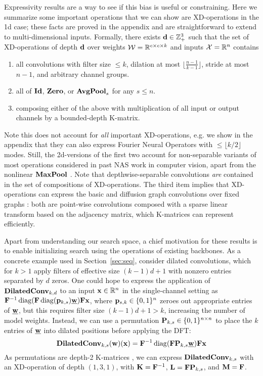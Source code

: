 Expressivity results are a way to see if this bias is useful or constraining.
Here we summarize some important operations that we can show are XD-operations in the 1d case; 
these facts are proved in the appendix and are straightforward to extend to multi-dimensional inputs.
Formally, there exists $\mathbf{d}\in\mathbb Z_+^3$ such that the set of XD-operations of depth $\mathbf{d}$ over weights $\mathcal W=\mathbb R^{c\times c\times k}$ and inputs $\mathcal X=\mathbb R^n$ contains
\begin{enumerate}[leftmargin=*,topsep=-1pt,noitemsep]\setlength\itemsep{2pt}
	\item all convolutions with filter size $\le k$, dilation at most $\lfloor\frac{n-1}{k-1}\rfloor$, stride at most $n-1$, and arbitrary channel groups.
	\item all of $\operatorname{\operatorname{\bf Id}}$, $\operatorname{\operatorname{\bf Zero}}$, or $\operatorname{\operatorname{\bf AvgPool}}_s$ for any $s\le n$.
	\item composing either of the above with multiplication of all input or output channels by a bounded-depth K-matrix.
\end{enumerate}
Note this does not account for {\em all} important XD-operations, e.g. we show in the appendix that they can also express Fourier Neural Operators \citep{li2021fno} with $\le\lfloor k/2\rfloor$ modes.
Still, the 2d-versions of the first two account for non-separable variants of most operations considered in past NAS work in computer vision, apart from the nonlinear $\operatorname{\operatorname{\bf MaxPool}}$ \citep{ying2019nasbench101,dong2020nasbench201}.
Note that depthwise-separable convolutions {\em are} contained in the set of compositions of XD-operations.
The third item implies that XD-operations can express the basic and diffusion graph convolutions over fixed graphs \citep{kipf2017gcn,li2018dcrnn}:
both are point-wise convolutions composed with a sparse linear transform based on the adjacency matrix, which  K-matrices can represent efficiently.

Apart from understanding our search space, a chief motivation for these results is to enable initializing search using the operations of existing backbones.
As a concrete example used in Section~\ref{sec:seq}, consider dilated convolutions, which for $k>1$ apply filters of effective size $(k-1)d+1$ with nonzero entries separated by $d$ zeros.
One could hope to express the application of $\operatorname{\operatorname{\bf DilatedConv}}_{k,d}$ to an input $\mathbf{x}\in\mathbb R^n$ in the single-channel setting as $\mathbf{F}^{-1}\operatorname{\operatorname{diag}}(\mathbf{F}\operatorname{\operatorname{diag}}(\mathbf{p}_{k,s})\underline{\mathbf{w}})\mathbf{F}\mathbf{x}$, where $\mathbf{p}_{s,k}\in\{0,1\}^n$ zeroes out appropriate entries of $\underline{\mathbf{w}}$, but this requires filter size $(k-1)d+1>k$, increasing the number of model weights.
Instead, we can use a permutation $\mathbf{P}_{k,s}\in\{0,1\}^{n\times n}$ to place the $k$ entries of $\underline{\mathbf{w}}$ into dilated positions before applying the DFT:
\begin{equation}\label{eq:dilated}
	\operatorname{\operatorname{\bf DilatedConv}}_{k,s}(\mathbf{w})(\mathbf{x})=\mathbf{F}^{-1}\operatorname{\operatorname{diag}}(\mathbf{F}\mathbf{P}_{k,s}\underline{\mathbf{w}})\mathbf{F}\mathbf{x}
\end{equation}
As permutations are depth-2 K-matrices \citep{dao2020kaleidoscope}, we can express $\operatorname{\operatorname{\bf DilatedConv}}_{k,s}$ with an XD-operation of depth $(1,3,1)$, with $\mathbf{K}=\mathbf{F}^{-1}$, $\mathbf{L}=\mathbf{F}\mathbf{P}_{k,s}$, and $\mathbf{M}=\mathbf{F}$.